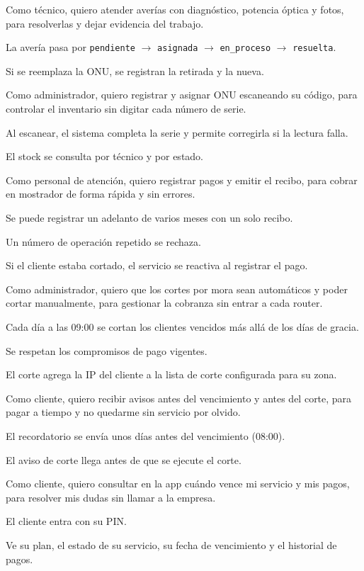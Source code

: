 {Como técnico, quiero atender averías con diagnóstico, potencia óptica y fotos, para
resolverlas y dejar evidencia del trabajo.}
{\item La avería pasa por \texttt{pendiente} $\rightarrow$ \texttt{asignada} $\rightarrow$ \texttt{en\_proceso} $\rightarrow$ \texttt{resuelta}.
 \item Si se reemplaza la ONU, se registran la retirada y la nueva.}

{Como administrador, quiero registrar y asignar ONU escaneando su código, para
controlar el inventario sin digitar cada número de serie.}
{\item Al escanear, el sistema completa la serie y permite corregirla si la lectura falla.
 \item El stock se consulta por técnico y por estado.}

{Como personal de atención, quiero registrar pagos y emitir el recibo, para cobrar en
mostrador de forma rápida y sin errores.}
{\item Se puede registrar un adelanto de varios meses con un solo recibo.
 \item Un número de operación repetido se rechaza.
 \item Si el cliente estaba cortado, el servicio se reactiva al registrar el pago.}

{Como administrador, quiero que los cortes por mora sean automáticos y poder cortar
manualmente, para gestionar la cobranza sin entrar a cada router.}
{\item Cada día a las 09:00 se cortan los clientes vencidos más allá de los días de gracia.
 \item Se respetan los compromisos de pago vigentes.
 \item El corte agrega la IP del cliente a la lista de corte configurada para su zona.}

{Como cliente, quiero recibir avisos antes del vencimiento y antes del corte, para
pagar a tiempo y no quedarme sin servicio por olvido.}
{\item El recordatorio se envía unos días antes del vencimiento (08:00).
 \item El aviso de corte llega antes de que se ejecute el corte.}

{Como cliente, quiero consultar en la app cuándo vence mi servicio y mis pagos, para
resolver mis dudas sin llamar a la empresa.}
{\item El cliente entra con su PIN.
 \item Ve su plan, el estado de su servicio, su fecha de vencimiento y el historial de pagos.}

